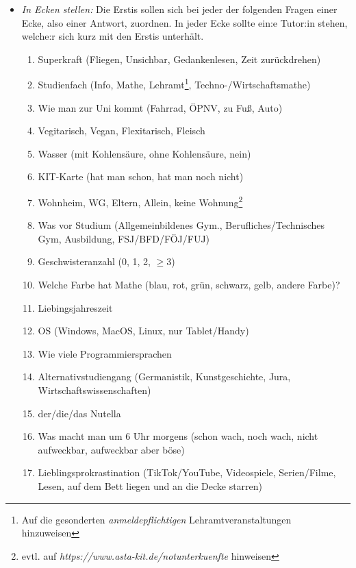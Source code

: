 \documentclass[10pt,twocolumn,ngerman]{scrartcl}
\begin{document}
\begin{itemize}
    \item \emph{In Ecken stellen:} Die Erstis sollen sich bei jeder der
        folgenden Fragen einer Ecke, also einer Antwort, zuordnen. In jeder Ecke
        sollte ein:e Tutor:in stehen, welche:r sich kurz mit den Erstis
        unterhält.
        \begin{enumerate}
            \item Superkraft (Fliegen, Unsichbar, Gedankenlesen, Zeit zurückdrehen)
            \item Studienfach (Info, Mathe, Lehramt\footnote{Auf die gesonderten \emph{anmeldepflichtigen} Lehramtveranstaltungen hinzuweisen}, Techno-/Wirtschaftsmathe)
            \item Wie man zur Uni kommt (Fahrrad, ÖPNV, zu Fuß, Auto)
            \item Vegitarisch, Vegan, Flexitarisch, Fleisch
            \item Wasser (mit Kohlensäure, ohne Kohlensäure, nein)
            \item KIT-Karte (hat man schon, hat man noch nicht)
            \item Wohnheim, WG, Eltern, Allein, keine Wohnung\footnote{evtl. auf \emph{https://www.asta-kit.de/notunterkuenfte} hinweisen}
            \item Was vor Studium (Allgemeinbildenes Gym., Berufliches/Technisches Gym, Ausbildung, FSJ/BFD/FÖJ/FUJ)
            \item Geschwisteranzahl (0, 1, 2, $\geq 3$)
            \item Welche Farbe hat Mathe (blau, rot, grün, schwarz, gelb, andere Farbe)?
            \item Liebingsjahreszeit 
            \item OS (Windows, MacOS, Linux, nur Tablet/Handy)
            \item Wie viele Programmiersprachen
            \item Alternativstudiengang (Germanistik, Kunstgeschichte, Jura, Wirtschaftswissenschaften)
            \item der/die/das Nutella
            \item Was macht man um 6 Uhr morgens (schon wach, noch wach, nicht aufweckbar, aufweckbar aber böse)
            \item Lieblingsprokrastination (TikTok/YouTube, Videospiele, Serien/Filme, Lesen, auf dem Bett liegen und an die Decke starren)
        \end{enumerate}


\end{itemize}
\end{document}
